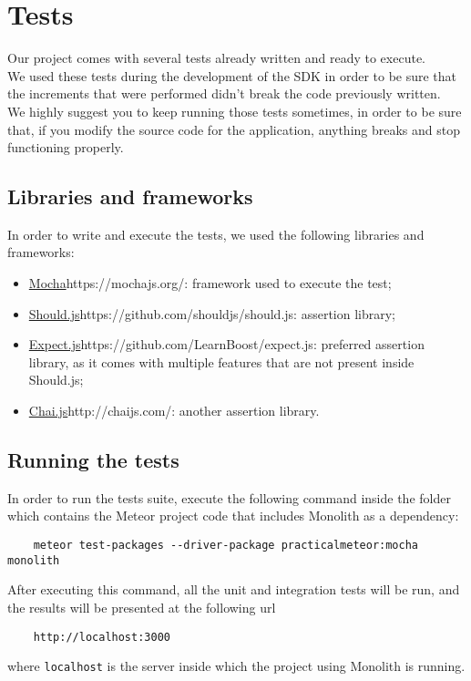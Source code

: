 \section{Tests}
Our project comes with several tests already written and ready to execute. \\
We used these tests during the development of the SDK in order to be sure that the increments that were performed didn't break the code previously written. \\
We highly suggest you to keep running those tests sometimes, in order to be sure that, if you modify the source code for the application, anything breaks and stop functioning properly. \\


\subsection{Libraries and frameworks}
In order to write and execute the tests, we used the following libraries and frameworks:
\begin{itemize}
	\item \url{Mocha}{https://mochajs.org/}: framework used to execute the test;
	\item \url{Should.js}{https://github.com/shouldjs/should.js}: assertion library;
	\item \url{Expect.js}{https://github.com/LearnBoost/expect.js}: preferred assertion library, as it comes with multiple features that are not present inside Should.js;
	\item \url{Chai.js}{http://chaijs.com/}: another assertion library.
\end{itemize}

\subsection{Running the tests}
In order to run the tests suite, execute the following command inside the folder which contains the Meteor project code that includes Monolith as a dependency:

\begin{lstlisting}
    meteor test-packages --driver-package practicalmeteor:mocha monolith
\end{lstlisting}

After executing this command, all the unit and integration tests will be run, and the results will be presented at the following url

\begin{lstlisting}
    http://localhost:3000
\end{lstlisting}

where \texttt{localhost} is the server inside which the project using Monolith is running.